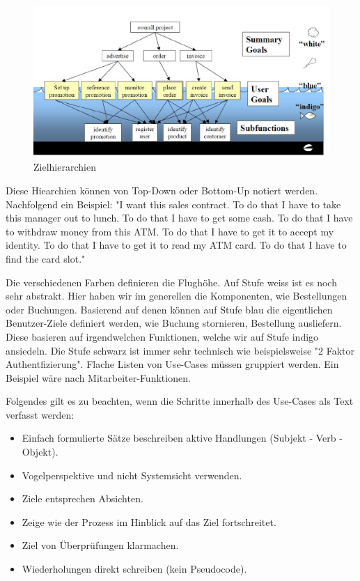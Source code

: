 \begin{figure}[h!]
\centering
\includegraphics[width=0.9\linewidth]{fig/zielhierarchien}
\caption{Zielhierarchien}
\label{fig:zielhierarchien}
\end{figure}

Diese Hiearchien können von Top-Down oder Bottom-Up notiert werden. Nachfolgend ein Beispiel: "I want this sales contract. To do that I have to take this manager out to lunch. To do that I have to get some cash. To do that I have to withdraw money from this ATM. To do that I have to get it to accept my identity. To do that I have to get it to read my ATM card. To do that I have to find the card slot."

Die verschiedenen Farben definieren die Flughöhe. Auf Stufe weiss ist es noch sehr abstrakt. Hier haben wir im generellen die Komponenten, wie Bestellungen oder Buchungen. Basierend auf denen können auf Stufe blau die eigentlichen Benutzer-Ziele definiert werden, wie Buchung stornieren, Bestellung ausliefern. Diese basieren auf irgendwelchen Funktionen, welche wir auf Stufe indigo ansiedeln. Die Stufe schwarz ist immer sehr technisch wie beispielsweise "2 Faktor Authentfizierung". Flache Listen von Use-Cases müssen gruppiert werden. Ein Beispiel wäre nach Mitarbeiter-Funktionen.

Folgendes gilt es zu beachten, wenn die Schritte innerhalb des Use-Cases als Text verfasst werden:
\begin{itemize}
	\item Einfach formulierte Sätze beschreiben aktive Handlungen (Subjekt - Verb - Objekt).
	\item Vogelperspektive und nicht Systemsicht verwenden.
	\item Ziele entsprechen Absichten.
	\item Zeige wie der Prozess im Hinblick auf das Ziel fortschreitet.
	\item Ziel von Überprüfungen klarmachen.
	\item Wiederholungen direkt schreiben (kein Pseudocode).
\end{itemize}

